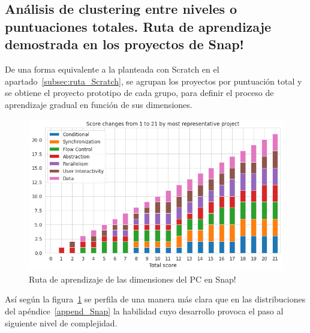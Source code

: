 \documentclass[a4paper, 12pt]{book}
\begin{document}
\subsection{Análisis de clustering entre niveles o puntuaciones totales. Ruta de aprendizaje demostrada en los proyectos de Snap!}
\label{subsec:ruta_Snap}

De una forma equivalente a la planteada con Scratch en el apartado~\ref{subsec:ruta_Scratch}, se agrupan los proyectos por puntuación total y se obtiene el proyecto prototipo de cada grupo, para definir el proceso de aprendizaje gradual en función de sus dimensiones. 

\begin{figure}[H]
    \centering
    \includegraphics[width=.8\textwidth]{img/path_CT_Snap.png}
    \caption{Ruta de aprendizaje de las dimensiones del PC en Snap!}\label{fig:path_Snap}
\end{figure}

Así según la figura~\ref{fig:path_Snap} se perfila de una manera más clara que en las distribuciones del apéndice~\ref{append_Snap} la habilidad cuyo desarrollo provoca el paso al siguiente nivel de complejidad. 
\end{document}
